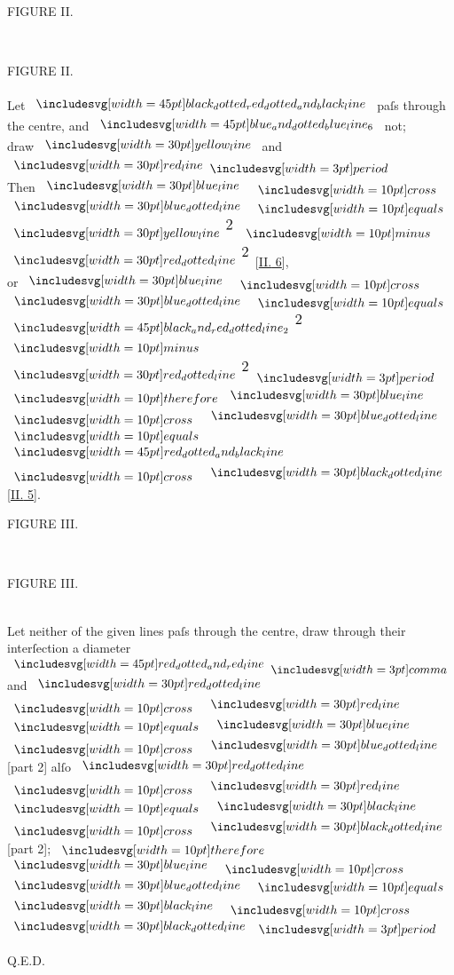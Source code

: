 \documentclass[11pt,preview]{standalone}
\begin{document}
\hfill

\begin{minipage}[t]{0.43\textwidth}
    \vspace{0pt}
    \begin{center}
        FIGURE II.
    \end{center}
    \hfill\\
    
\end{minipage}%
\hfill
\begin{minipage}[t]{0.54\textwidth}
    \vspace{0pt}

    \begin{center}
        FIGURE II.\\
        \hfill\\
        Let $\bimg{black_dotted_red_dotted_and_black_line}$ paſs through the centre, and
        $\bimg{blue_and_dotted_blue_line_6}$ not;\\
        draw $\yellowline$ and $\redline \bperiod$\\
        Then $\blueline$ $\bcross$ $\dottedblueline$ $\bequals$ $\yellowline^{\text{\large 2}}$ $\bminus$ $\dottedredline^{\text{\large 2}}$ [\hyperref[book2pr6]{\textsc{II.} 6}], \\
        or $\blueline$ $\bcross$ $\dottedblueline$ $\bequals$ $\bimg{black_and_red_dotted_line_2}^{\text{\large 2}}$ $\bminus$ $\dottedredline^{\text{\large 2}}$ $\bperiod$ $\btherefore \blueline$ $\bcross$ $\dottedblueline$ $\bequals$ $\bimg{red_dotted_and_black_line}$ $\bcross$ $\dottedblackline$ [\hyperref[book2pr5]{\textsc{II.} 5}].
    \end{center}
\end{minipage}%

\hfill

\begin{minipage}[t]{0.43\textwidth}
    \vspace{0pt}
    \begin{center}
        FIGURE III.
    \end{center}
    \hfill\\
    
\end{minipage}%
\hfill
\begin{minipage}[t]{0.54\textwidth}
    \vspace{0pt}

    \begin{center}
        FIGURE III.\\
        \hfill\\
        \raggedright Let neither of the given lines paſs through the centre, draw through their interſection a diameter $\bimg{red_dotted_and_red_line} \bcomma$ and $\dottedredline$ $\bcross$ $\redline$ $\bequals$ $\blueline$ $\bcross$ $\dottedblueline$ [part 2] alſo $\dottedredline$ $\bcross$ $\redline$  $\bequals$ $\blackline$ $\bcross$ $\dottedblackline$ [part 2]; $\btherefore$ $\blueline$ $\bcross$ $\dottedblueline$ $\bequals$ $\blackline$ $\bcross$ $\dottedblackline$ $\bperiod$
    \end{center}

\end{minipage}%

\hfill

\hfill Q.E.D.
\end{document}
